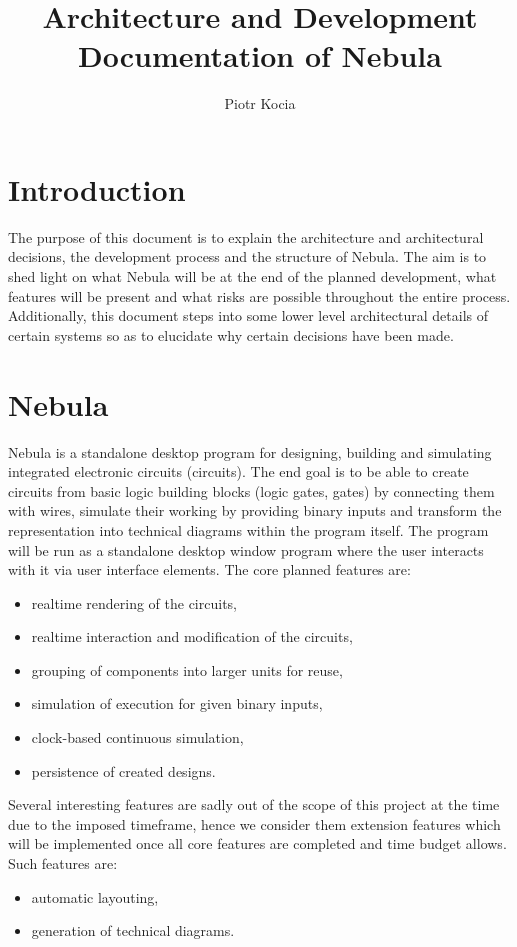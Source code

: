 \documentclass[12pt, a4paper]{article}
\title{Architecture and Development Documentation of Nebula}
\author{Piotr Kocia}
\date{}
\newenvironment{itemlist}
{
  \vspace{-0.5\topsep}
  \begin{itemize}
    \setlength{\itemsep}{4pt}
    \setlength{\parskip}{0pt}
} {
  \end{itemize}
  \vspace{-0.5\topsep}
}
\begin{document}
\maketitle

\tableofcontents

\section{Introduction}
The purpose of this document is to explain the architecture and architectural
decisions, the development process and the structure of Nebula. The aim is to
shed light on what Nebula will be at the end of the planned development, what
features will be present and what risks are possible throughout the entire
process. Additionally, this document steps into some lower level architectural
details of certain systems so as to elucidate why certain decisions have been
made.

\section{Nebula}
Nebula is a standalone desktop program for designing, building and simulating
integrated electronic circuits (circuits). The end goal is to be able to create
circuits from basic logic building blocks (logic gates, gates) by connecting
them with wires, simulate their working by providing binary inputs and transform
the representation into technical diagrams within the program itself. The
program will be run as a standalone desktop window program where the user
interacts with it via user interface elements. The core planned features are:
\begin{itemlist}
\item realtime rendering of the circuits,
\item realtime interaction and modification of the circuits,
\item grouping of components into larger units for reuse,
\item simulation of execution for given binary inputs,
\item clock-based continuous simulation,
\item persistence of created designs.
\end{itemlist}

Several interesting features are sadly out of the scope of this project at the
time due to the imposed timeframe, hence we consider them extension features
which will be implemented once all core features are completed and time budget
allows. Such features are:
\begin{itemlist}
\item automatic layouting,
\item generation of technical diagrams.
\end{itemlist}
\end{document}
